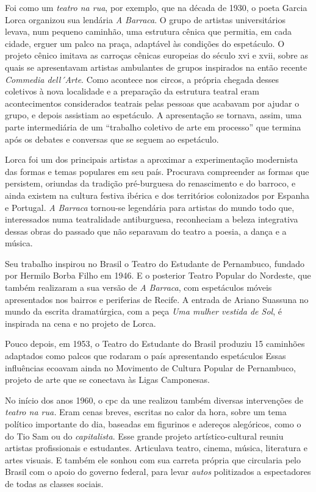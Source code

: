 Foi como um {\it teatro na rua}, por exemplo, que na década de 1930, o
poeta Garcia Lorca organizou sua lendária {\it A Barraca}. O grupo de
artistas universitários levava, num pequeno caminhão, uma estrutura
cênica que permitia, em cada cidade, erguer um palco na praça, adaptável
às condições do espetáculo. O projeto cênico imitava as carroças cênicas
europeias do século {\sc xvi} e {\sc xvii}, sobre as quais se apresentavam artistas
ambulantes de grupos inspirados na então recente {\it Commedia
dell´Arte}. Como acontece nos circos, a própria chegada desses coletivos
à nova localidade e a preparação da estrutura teatral eram
acontecimentos considerados teatrais pelas pessoas que acabavam por
ajudar o grupo, e depois assistiam ao espetáculo. A apresentação se
tornava, assim, uma parte intermediária de um “trabalho coletivo de arte
em processo” que termina após os debates e conversas que se seguem ao
espetáculo.

Lorca foi um dos principais artistas a aproximar a experimentação
modernista das formas e temas populares em seu país. Procurava
compreender as formas que persistem, oriundas da tradição pré-burguesa
do renascimento e do barroco, e ainda existem na cultura festiva ibérica
e dos territórios colonizados por Espanha e Portugal. {\it A Barraca}
tornou-se legendária para artistas do mundo todo que, interessados numa
teatralidade antiburguesa, reconheciam a beleza integrativa dessas obras
do passado que não separavam do teatro a poesia, a dança e a música.

Seu trabalho inspirou no Brasil o Teatro do Estudante de Pernambuco,
fundado por Hermilo Borba Filho em 1946. E o posterior Teatro Popular do
Nordeste, que também realizaram a sua versão de {\it A Barraca}, com
espetáculos móveis apresentados nos bairros e periferias de Recife. A
entrada de Ariano Suassuna no mundo da escrita dramatúrgica, com a peça
{\it Uma mulher vestida de Sol}, é inspirada na cena e no projeto de
Lorca.

Pouco depois, em 1953, o Teatro do Estudante do Brasil produziu 15
caminhões adaptados como palcos que rodaram o país apresentando
espetáculos Essas influências ecoavam ainda no Movimento de Cultura
Popular de Pernambuco, projeto de arte que se conectava às Ligas
Camponesas.

No início dos anos 1960, o {\sc cpc} da {\sc une} realizou também diversas
intervenções de {\it teatro na rua.} Eram cenas breves, escritas no
calor da hora, sobre um tema político importante do dia, baseadas em
figurinos e adereços alegóricos, como o do Tio Sam ou do
{\it capitalista}. Esse grande projeto artístico-cultural reuniu
artistas profissionais e estudantes. Articulava teatro, cinema, música,
literatura e artes visuais. E também ele sonhou com sua carreta própria
que circularia pelo Brasil com o apoio do governo federal, para levar
{\it autos} politizados a espectadores de todas as classes sociais.


